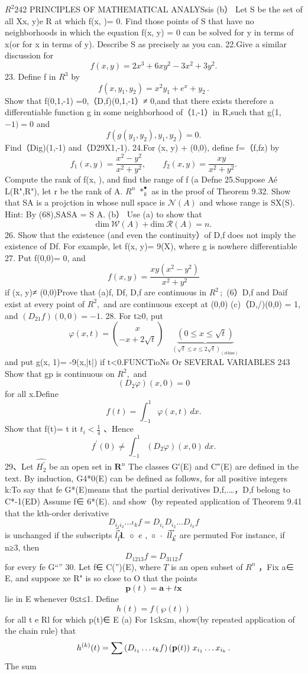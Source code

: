 $\textstyle{R^{2}}$242 PRINCIPLES OF MATHEMATICAL ANALYSsis (b） Let S be the set of all Xx, y)e R at which f(x, )= 0. Find those points of S that have no neighborhoods in which the equation f(x, y) = 0 can be solved for y in terms of x(or for x in terms of y). Describe S as precisely as you can. 22.Give a similar discussion for $$ f(x,y)=2x^{3}+6x y^{2}-3x^{2}+3y^{2}. $$ 23. Define f in $\textstyle R^{3}$ by $$ f(x,y_{1},y_{2})=x^{2}y_{1}+e^{x}+y_{2}\,. $$ Show that f(0,1,-1) =0,（D,f)(0,1,-1）≠ 0,and that there exists therefore a differentiable function g in some neighborhood of（1,-1）in R,such that g(1, $-1)=0$ and $$ f(g(y_{1},y_{2}),y_{1},y_{2})=0. $$ Find（Dig)(1,-1) and（D29X1,-1). 24.For (x, y) + (0,0), define f=（f,fz) by $$ f_{1}\left(x,y\right)=\frac{x^{2}-y^{2}}{x^{2}+y^{2}},\qquad f_{2}(x,y)=\frac{x y}{x^{2}+y^{2}}. $$ Compute the rank of f(x, ), and find the range of f (a Defne 25.Suppose Aé L(R",R"), let r be the rank of A. $R^{n}$ $*_{k}^{\bullet}$ as in the proof of Theorem 9.32. Show that SA is a projction in whose null space is ${\mathcal{N}}(A)$ and whose range is SX(S). Hint: By (68),SASA = S A. (b） Use (a) to show that $$ \mathrm{dim}\ {\mathcal W}(A)+\mathrm{dim}\ {\mathcal R}(A)=n. $$ 26. Show that the existence (and even the continuity）of D,f does not imply the existence of Df. For example, let f(x, y)= 9(X), where g is nowhere differentiable 27. Put f(0,0)= 0, and $$ f(x,y)={\frac{x y(x^{2}-y^{2})}{x^{2}+y^{2}}} $$ if (x, y)≠ (0,0)Prove that (a)f, Df, D,f are continuous in $R^{2}\,;$ (6）D,f and Daif exist at every point of $R^{2},$ and are continuous except at (0,0) (c)（D,/)(0,0) = 1, and $(D_{21}f)(0,0)=-1.$ 28. For t≥0, put $$ \varphi(x,t)={\binom{x}{-x+2{\sqrt{t}}}}\quad\underbrace{(0\leq x\leq{\sqrt{t}})}_{({\sqrt{t}}\leq x\leq2{\sqrt{t}})}_{({\mathrm{othiss}})} $$ and put g(x, 1)= -9(x,|t|) if t<0.FUNCTioNs Or SEVERAL VARIABLES 243 Show that gp is continuous on $R^{2},$ and $$ (D_{2}\varphi)(x,0)=0 $$ for all x.Define $$ f(t)=\int_{-1}^{1}\varphi(x,t)\,d x. $$ Show that f(t)= t it $\scriptstyle t_{i}<{\frac{1}{4}}$ 、Hence $$ f^{\prime}(0)\neq\int_{-1}^{1}(D_{2}\varphi)(x,0)\,d x. $$ 29、Let ${\widehat{H_{2}^{\prime}}}$ be an open set in ${\boldsymbol{R}}^{n}$ The classes G′(E) and C″(E) are defined in the text. By induction, G4*0(E) can be defined as follows, for all positive integers k:To say that fe G*(E)means that the partial derivatives D,f,.…，D,f belong to C*-1(ED) Assume f∈ 6*(E). and show（by repeated application of Theorem 9.41 that the kth-order derivative $$ D_{i_{1}i_{2}}\dots\iota_{k}f=D_{i_{1}}D_{i_{2}}\dots D_{i_{k}}f $$ is unchanged if the subscripts $\ddot{\vec{l}}_{\vec{l}}{\bf l.}\ \circ\ e\ ,\ \circ\ \cdot\ \vec{l}\vec{l}_{\vec{k}}$ are permuted For instance, if n≥3, then $$ D_{1213}f=D_{3112}f $$ for every fe G“” 30. Let f∈ C(”)(E), where $\underline{{T}}$ is an open subset of $\textstyle R^{n}$ ，Fix a∈ E, and suppose xe R" is so close to O that the points $$ \mathbf{p}(t)=\mathbf{a}+t\mathbf{x} $$ lie in E whenever 0≤t≤1. Define $$ h(t)=f(\wp(t)) $$ for all t e Rl for which p(t)∈ E (a) For 1≤k≤m, show(by repeated application of the chain rule) that $$ h^{(k)}(t)=\sum\left(D_{i_{1}}\ldots\iota_{k}f\right)\left({\bf p}(t)\right)\,x_{i_{1}}\ldots x_{i_{k}}\,. $$ The sum 
